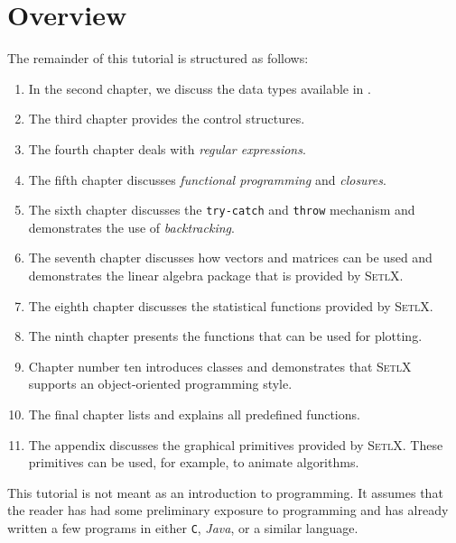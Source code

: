 \section{Overview}
The remainder
of this tutorial is structured as follows:
\begin{enumerate}
\item In the second chapter, we discuss the data types available in \setlx.
\item The third chapter provides the control structures.
\item The fourth chapter deals with \emph{regular expressions}.
\item The fifth chapter discusses \emph{functional programming} and \emph{closures}.
\item The sixth chapter discusses the \texttt{try-}\texttt{catch} and \texttt{throw}
      mechanism and demonstrates the use of \emph{backtracking}.
\item The seventh chapter discusses how vectors and matrices can be used and demonstrates the linear
      algebra package that is provided by \textsc{SetlX}.
\item The eighth chapter discusses the statistical functions provided by \textsc{SetlX}.
\item The ninth chapter presents the functions that can be used for plotting.
\item Chapter number ten introduces classes and demonstrates that \textsc{SetlX}
      supports an object-oriented programming style.
\item The final chapter lists and explains all predefined functions.
\item The appendix discusses the graphical primitives provided by \textsc{SetlX}.
      These primitives can be used, for example, to animate algorithms.
\end{enumerate}
This tutorial is not meant as an introduction to programming.  It assumes that the reader
has had some preliminary exposure to programming and has already written a few programs in
either \texttt{C}, \textsl{Java}, or a similar language.

